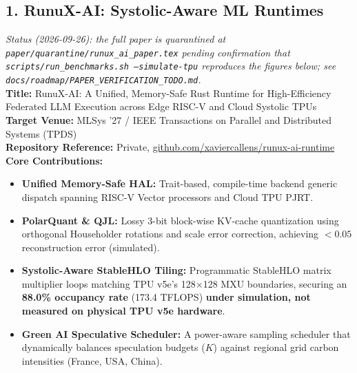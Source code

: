 \documentclass[11pt,a4paper]{article}
\begin{document}
\subsection{1. RunuX-AI: Systolic-Aware ML Runtimes}
\textit{\small Status (2026-09-26): the full paper is quarantined at \texttt{paper/quarantine/runux\_ai\_paper.tex} pending confirmation that \texttt{scripts/run\_benchmarks.sh --simulate-tpu} reproduces the figures below; see \texttt{docs/roadmap/PAPER\_VERIFICATION\_TODO.md}.} \\
\textbf{Title:} RunuX-AI: A Unified, Memory-Safe Rust Runtime for High-Efficiency Federated LLM Execution across Edge RISC-V and Cloud Systolic TPUs \\
\textbf{Target Venue:} MLSys '27 / IEEE Transactions on Parallel and Distributed Systems (TPDS) \\
\textbf{Repository Reference:} Private, \url{github.com/xaviercallens/runux-ai-runtime} \\
\textbf{Core Contributions:}
\begin{itemize}
    \item \textbf{Unified Memory-Safe HAL:} Trait-based, compile-time backend generic dispatch spanning RISC-V Vector processors and Cloud TPU PJRT.
    \item \textbf{PolarQuant \& QJL:} Lossy 3-bit block-wise KV-cache quantization using orthogonal Householder rotations and scale error correction, achieving $<0.05$ reconstruction error (simulated).
    \item \textbf{Systolic-Aware StableHLO Tiling:} Programmatic StableHLO matrix multiplier loops matching TPU v5e's 128$\times$128 MXU boundaries, securing an \textbf{88.0\% occupancy rate} (173.4 TFLOPS) \textbf{under simulation, not measured on physical TPU v5e hardware}.
    \item \textbf{Green AI Speculative Scheduler:} A power-aware sampling scheduler that dynamically balances speculation budgets ($K$) against regional grid carbon intensities (France, USA, China).
\end{itemize}
\end{document}
